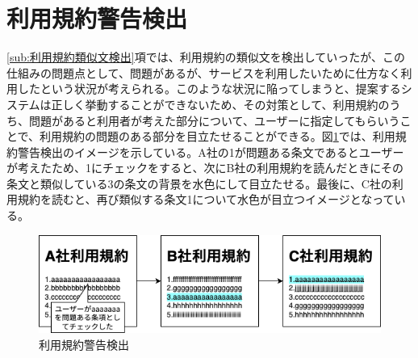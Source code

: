 \section{利用規約警告検出}
\label{sub:利用規約警告検出}
\ref{sub:利用規約類似文検出}項では、利用規約の類似文を検出していったが、この仕組みの問題点として、問題があるが、サービスを利用したいために仕方なく利用したという状況が考えられる。このような状況に陥ってしまうと、提案するシステムは正しく挙動することができないため、その対策として、利用規約のうち、問題があると利用者が考えた部分について、ユーザーに指定してもらいうことで、利用規約の問題のある部分を目立たせることができる。図\ref{img:demo_warning}では、利用規約警告検出のイメージを示している。A社の1が問題ある条文であるとユーザーが考えたため、1にチェックをすると、次にB社の利用規約を読んだときにその条文と類似している3の条文の背景を水色にして目立たせる。最後に、C社の利用規約を読むと、再び類似する条文1について水色が目立つイメージとなっている。
\begin{figure}[h]
  \begin{center}
      \includegraphics[width=15cm]{img/demo_warning.drawio.png}
      \caption{利用規約警告検出}
      \label{img:demo_warning}
  \end{center}
\end{figure}

